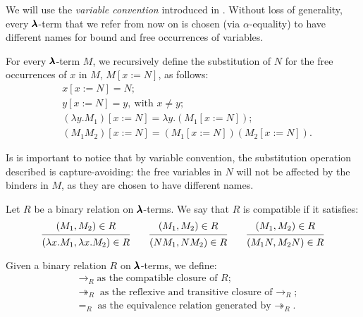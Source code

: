 \begin{convention} 
  We will use the \textit{variable convention} introduced in \cite{Barendregt1987}.
  Without loss of generality, every $\pmb{\lambda}$-term that we refer from now on is chosen (via $\alpha$-equality) to have different names for bound and free occurrences of variables.
\end{convention}

\begin{definition}[Substitution]
  For every $\pmb{\lambda}$-term $M$, we recursively define the substitution of $N$ for the free occurrences of $x$ in $M$, $M[x := N]$, as follows:
  \begin{align*}
    & x[x := N] = N; \\
    & y[x := N] = y, \ \text{with $x \neq y$}; \\
    & (\lambda y . M_1)[x := N] = \lambda y . (M_1[x := N]); \\
    & (M_1 M_2)[x := N] = (M_1[x := N]) (M_2[x := N]).
  \end{align*}
\end{definition}


\begin{remark}
  Is is important to notice that by variable convention, the substitution operation described is capture-avoiding: the free variables in $N$ will not be affected by the binders in $M$, as they are chosen to have different names. 
\end{remark}


\begin{definition}
  Let $R$ be a binary relation on $\pmb{\lambda}$-terms.
  We say that $R$ is compatible if it satisfies:
  \[
    \begin{prooftree}
      \hypo{ (M_1, M_2) \in R }
      \infer1{ (\lambda x . M_1, \lambda x . M_2) \in R } 
    \end{prooftree}
    \qquad
    \begin{prooftree}
      \hypo{ (M_1, M_2) \in R }
      \infer1{ (N M_1, N M_2) \in R } 
    \end{prooftree}
    \qquad
    \begin{prooftree}
      \hypo{ (M_1, M_2) \in R }
      \infer1{ (M_1 N, M_2 N) \in R }
    \end{prooftree}
  \]
\end{definition}


\begin{notation}
  Given a binary relation $R$ on $\pmb{\lambda}$-terms, we define:
  \begin{align*}
    & \to_R \text{as the compatible closure of $R$} ; \\
    & \twoheadrightarrow_R \text{as the reflexive and transitive closure of $\to_R$} ; \\
    & =_R \text{as the equivalence relation generated by $\twoheadrightarrow_R$}.
  \end{align*}
\end{notation}



